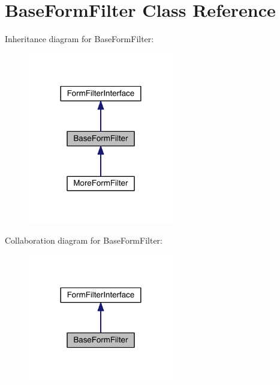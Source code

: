 \hypertarget{classapp_1_1models_1_1core_1_1_form_1_1_base_form_filter}{\section{Base\-Form\-Filter Class Reference}
\label{classapp_1_1models_1_1core_1_1_form_1_1_base_form_filter}
}


Inheritance diagram for Base\-Form\-Filter\-:
\nopagebreak
\begin{figure}[H]
\begin{center}
\leavevmode
\includegraphics[width=180pt]{classapp_1_1models_1_1core_1_1_form_1_1_base_form_filter__inherit__graph}
\end{center}
\end{figure}


Collaboration diagram for Base\-Form\-Filter\-:
\nopagebreak
\begin{figure}[H]
\begin{center}
\leavevmode
\includegraphics[width=180pt]{classapp_1_1models_1_1core_1_1_form_1_1_base_form_filter__coll__graph}
\end{center}
\end{figure}
